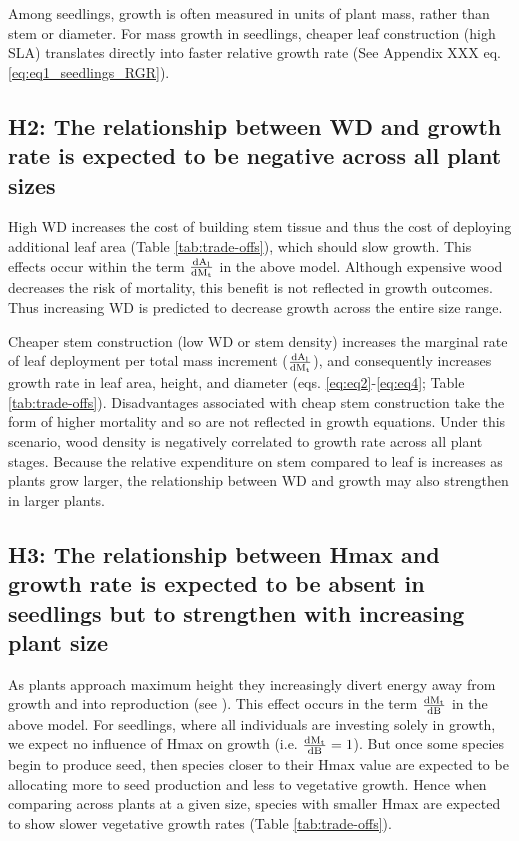 \documentclass[a4paper,11pt]{article}
\newcommand{\ud}{\ensuremath{\rm{d}}}
\begin{document}
Among seedlings, growth is often measured in units of plant mass, rather than stem or diameter. For mass growth in seedlings, cheaper leaf construction (high SLA)  translates directly into faster relative growth rate (See Appendix XXX eq. \ref{eq:eq1_seedlings_RGR}).

\subsection*{H2: The relationship between WD and growth rate is expected to be negative across all plant sizes}

High WD increases the cost of building stem tissue and thus the cost of deploying additional leaf area (Table \ref{tab:trade-offs}), which should slow growth. This effects occur within the term $\frac{\ud A_{\rm l}}{\ud M_{\rm t}}$ in the above model. Although expensive wood decreases the risk of mortality, this benefit is not reflected in growth outcomes. Thus increasing WD is predicted to decrease growth across the entire size range.

Cheaper stem construction (low WD or stem density) increases the marginal rate of leaf deployment per total mass increment ($\frac{\ud A_{\rm l}}{\ud M_{\rm t}}$), and consequently increases growth rate in leaf area, height, and diameter (eqs. \ref{eq:eq2}-\ref{eq:eq4}; Table \ref{tab:trade-offs}). Disadvantages associated with cheap stem construction take the form of higher mortality and so are not reflected in growth equations. Under this scenario, wood density is negatively correlated to growth rate across all plant stages. Because the relative expenditure on stem compared to leaf is increases as plants grow larger, the relationship between WD and growth may also strengthen in larger plants.

\subsection*{H3: The relationship between Hmax and growth rate is expected to be absent in seedlings but to strengthen with increasing plant size}

As plants approach maximum height they increasingly divert energy away from growth and into reproduction (see \citealt{Thomas:1996do,Thomas-2011, Wenk:2015jz}). This effect occurs in the term $\frac{\ud M_{\rm t}}{\ud B}$ in the above model. For seedlings, where all individuals are investing solely in growth, we expect no influence of Hmax on growth (i.e. $\frac{\ud M_{\rm t}}{\ud B} =1$). But once some species begin to produce seed, then species closer to their Hmax value are expected to be allocating more to seed production and less to vegetative growth. Hence when comparing across plants at a given size, species with smaller Hmax are expected to show slower vegetative growth rates (Table \ref{tab:trade-offs}).
\end{document}
